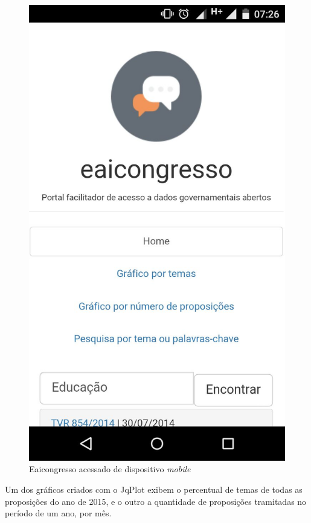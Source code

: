 \documentclass[
	12pt,				%
	openright,			%
	twoside,			%
	a4paper,			%
	english,			%
	french,				%
	spanish,			%
	brazil				%
	]{abntex2}
\begin{document}
{\begin{figure}[htb]
	\caption{\label{eaicong}Eaicongresso acessado de dispositivo \emph{mobile}}
	\begin{center}
	    \includegraphics[scale=4.65]{eaicong.jpg}
	\end{center}
\end{figure}


Um dos gráficos criados com o JqPlot exibem o percentual de temas de todas as proposições do ano de 2015, e o outro a quantidade de proposições
tramitadas no período de um ano, por mês.
}
\end{document}
